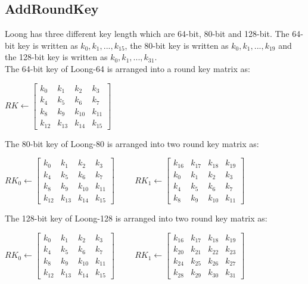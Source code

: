 \documentclass[preprint]{transcrypto}
\begin{document}
\subsection{AddRoundKey}
Loong has three different key length which are 64-bit, 80-bit and 128-bit. The 64-bit key is written as $k_0, k_1, ..., k_{15}$, the 80-bit key is written as $k_0, k_1, ..., k_{19}$ and the 128-bit key is written as $k_0, k_1, ..., k_{31}$.\\
The 64-bit key of Loong-64 is arranged into a round key matrix as:\\
\begin{center}
$ RK \leftarrow 
\begin{bmatrix}
k_0 & k_1 & k_2 & k_3 \\
k_4 & k_5 & k_6 & k_7 \\
k_8 & k_9 & k_{10} & k_{11} \\
k_{12} & k_{13} & k_{14} & k_{15}
\end{bmatrix}$
\end{center}
The 80-bit key of Loong-80 is arranged into two round key matrix as:\\
\begin{center}
$ RK_0 \leftarrow 
\begin{bmatrix}
k_0 & k_1 & k_2 & k_3 \\
k_4 & k_5 & k_6 & k_7 \\
k_8 & k_9 & k_{10} & k_{11} \\
k_{12} & k_{13} & k_{14} & k_{15}
\end{bmatrix} \hspace{1cm}
RK_1 \leftarrow 
\begin{bmatrix}
k_{16} & k_{17} & k_{18} & k_{19}\\
k_0 & k_1 & k_2 & k_3 \\
k_4 & k_5 & k_6 & k_7 \\
k_8 & k_9 & k_{10} & k_{11}
\end{bmatrix}$
\end{center}
The 128-bit key of Loong-128 is arranged into two round key matrix as:\\
\begin{center}
$ RK_0 \leftarrow 
\begin{bmatrix}
k_0 & k_1 & k_2 & k_3 \\
k_4 & k_5 & k_6 & k_7 \\
k_8 & k_9 & k_{10} & k_{11} \\
k_{12} & k_{13} & k_{14} & k_{15}
\end{bmatrix} \hspace{1cm}
RK_1 \leftarrow 
\begin{bmatrix}
k_{16} & k_{17} & k_{18} & k_{19}\\
k_{20} & k_{21} & k_{22} & k_{23} \\
k_{24} & k_{25} & k_{26} & k_{27} \\
k_{28} & k_{29} & k_{30} & k_{31}
\end{bmatrix}$
\end{center}
\end{document}
